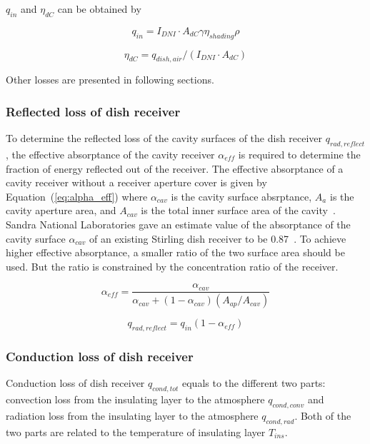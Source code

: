 \documentclass{article}
\begin{document}
$q_{in}$ and $\eta_{dC}$ can be obtained by

\begin{equation}
	q_{in}=I_{DNI}\cdot A_{dC}\gamma\eta_{shading}\rho
	\label{eq:q_in}
\end{equation}

\begin{equation}
	\eta_{dC}=q_{dish,air}/\left(I_{DNI}\cdot A_{dC}\right)
	\label{eq:eta_dC}
\end{equation}

Other losses are presented in following sections.

\subsubsection{Reflected loss of dish receiver}
To determine the reflected loss of the cavity surfaces of the dish receiver $q_{rad,reflect}$, the effective absorptance of the cavity receiver $\alpha_{eff}$ is required to determine the fraction of energy reflected out of the receiver. The effective absorptance of a cavity receiver without a receiver aperture cover is given by Equation~(\ref{eq:alpha_eff}) where $\alpha_{cav}$ is the cavity surface absrptance, $A_a$ is the cavity aperture area, and $A_{cav}$ is the total inner surface area of the cavity~\cite{Duffie2013}. Sandra National Laboratories gave an estimate value of the absorptance of the cavity surface $\alpha_{cav}$ of an existing Stirling dish receiver to be 0.87~\cite{Hogan1994}. To achieve higher effective absorptance, a smaller ratio of the two surface area should be used. But the ratio is constrained by the concentration ratio of the receiver.

\begin{equation}
	\alpha_{eff}=\dfrac{\alpha_{cav}}{\alpha_{cav}+\left(1-\alpha_{cav}\right)\left(A_{ap}/A_{cav}\right)}
	\label{eq:alpha_eff}
\end{equation}

\begin{equation*}
	q_{rad,reflect}=q_{in}(1-\alpha_{eff})
\end{equation*}

\subsubsection{Conduction loss of dish receiver}
Conduction loss of dish receiver $q_{cond,tot}$ equals to the different two parts: convection loss from the insulating layer to the atmosphere $q_{cond,conv}$ and radiation loss from the insulating layer to the atmosphere $q_{cond,rad}$. Both of the two parts are related to the temperature of insulating layer $T_{ins}$.
\end{document}
